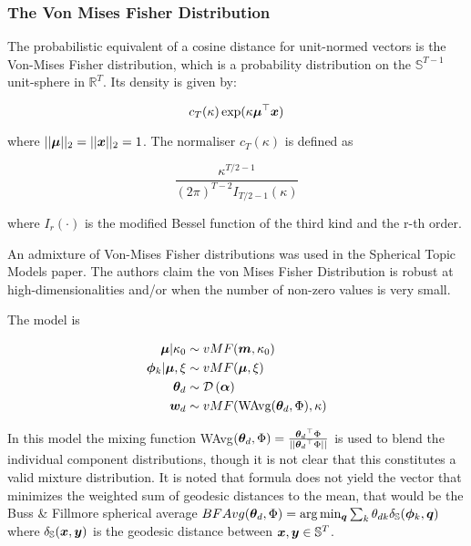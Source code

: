 \subsubsection*{The Von Mises Fisher Distribution}

The probabilistic equivalent of a cosine distance for unit-normed vectors is the Von-Mises Fisher distribution, which is a probability distribution on the $\mathbb{S}^{T-1}$ unit-sphere in $\mathbb{R}^{T}$. Its density is given by:

\begin{equation}
c_T(\kappa)\exp(\kappa \bm \mu^\top\bm x)
\end{equation}

where $||\bm \mu||_2 = ||\bm x||_2 = 1$. The normaliser $c_T(\kappa)$ is defined as

\begin{equation}
\frac{\kappa ^{T\!/\!2-1}}{(2\pi)^{T-2} I_{T\!/\!2-1}(\kappa)}
\end{equation}

where $I_r(\cdot)$ is the modified Bessel function of the third kind and the r-th order.


An admixture of Von-Mises Fisher distributions was used in the Spherical Topic Models paper\cite{Reisinger2010}. The authors claim the von Mises Fisher Distribution is robust at high-dimensionalities and/or when the number of non-zero values is very small.

The model is

\begin{align}
\bm \mu | \kappa_0 & \sim  vMF(\bm m, \kappa_0) \\
\bm \phi_k | \bm \mu, \xi & \sim  vMF(\bm \mu, \xi) \\
{ \bm \theta_d } & \sim  \mathcal{D} \left( {\bm \alpha} \right) \\
{ \bm w_d } & \sim  vMF(\text{WAvg}({ \bm \theta_d }, \Phi), \kappa) 
\end{align}

In this model the mixing function WAvg$({ \bm \theta_d }, \Phi) = \frac{{ \bm \theta_d }^\top\Phi}{||{ \bm \theta_d }^\top\Phi||}$ is used to blend the individual component distributions, though it is not clear that this constitutes a valid mixture distribution.  It is noted that formula does not yield the vector that minimizes the weighted sum of geodesic distances to the mean, that would be the  Buss \& Fillmore spherical average $BFAvg({ \bm \theta_d },\Phi) = \arg \min_{\bm q} \sum_k { \theta_{dk} } \delta_\mathbb{S}(\bm \phi_k, \bm q)$ where $\delta_\mathbb{S}(\bm x, \bm y)$ is the geodesic distance between $\bm x, \bm y \in \mathbb{S}^T$. 

